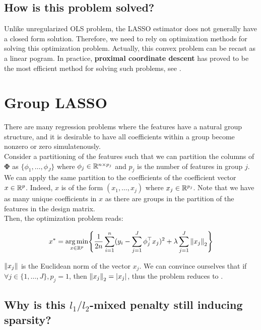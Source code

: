 \documentclass[a4paper,10pt]{article}
\theoremstyle{definition}
\begin{document}
\subsection*{How is this problem solved?}

Unlike unregularized OLS problem, the LASSO estimator does not generally have a closed form solution. Therefore, we need to rely on optimization methods for solving this optimization problem. Actually, this convex problem
can be recast as a linear pogram. In practice, \textbf{proximal coordinate descent} has proved to be the most efficient method for solving such problems, see \cite{Bertrand_Massias_Anderson}.

\section{Group LASSO}
\label{section_2}

There are many regression problems where the features have a natural group structure, and it is desirable to have all coefficients within a group become nonzero or zero simulatenously.
\\
Consider a partitioning of the features such that we can partition the columns of $\mathbf{\Phi}$ as $\{\phi_{1}, \dots, \phi_{J}\}$ where $\phi_{j} \in \mathbb{R}^{n \times p_j}$ and
$p_j$ is the number of features in group $j$. We can apply the same partition to the coefficients of the coefficient vector $x \in \mathbb{R}^p$. Indeed, $x$ is of the form $(x_{1}, \dots, x_{j})$ where
$x_{j} \in \mathbb{R}^{p_j}$. Note that we have as many unique coefficients in $x$ as there are groups in the partition of the features in the design matrix.
\\

Then, the optimization problem reads:

\begin{equation*}
    x^* = \operatorname*{arg\,min}_{x \in \mathbb{R}^p} \Biggl\{ \frac{1}{2n} \sum_{i=1}^n (y_i - \sum_{j=1}^J \phi_{j}^\top x_{j})^2 + \lambda \sum_{j=1}^{J} \left \lVert  x_{j} \right \rVert_2 \Biggr\}
\end{equation*}

$ \left \lVert x_{j} \right \rVert$ is the Euclidean norm of the vector $x_{j}$. We can convince ourselves that if $\forall j \in \{1, \dots, J\}, p_j = 1$, then $\left \lVert  x_{j} \right \rVert_2 = \lvert x_{j} \rvert$,
thus the problem reduces to .

\subsection*{Why is this $l_1 / l_2$-mixed penalty still inducing sparsity?}
\end{document}
